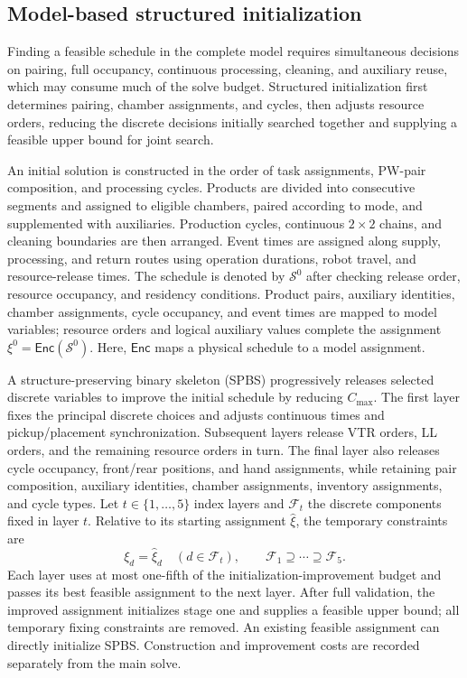 \documentclass[final,5p,times,twocolumn]{elsarticle}
\begin{document}
\subsection{Model-based structured initialization}
\label{sec:pjob-encoding-cn}
Finding a feasible schedule in the complete model requires simultaneous decisions on pairing, full occupancy, continuous processing, cleaning, and auxiliary reuse, which may consume much of the solve budget. Structured initialization first determines pairing, chamber assignments, and cycles, then adjusts resource orders, reducing the discrete decisions initially searched together and supplying a feasible upper bound for joint search.

An initial solution is constructed in the order of task assignments, PW-pair composition, and processing cycles. Products are divided into consecutive segments and assigned to eligible chambers, paired according to mode, and supplemented with auxiliaries. Production cycles, continuous $2\times2$ chains, and cleaning boundaries are then arranged. Event times are assigned along supply, processing, and return routes using operation durations, robot travel, and resource-release times. The schedule is denoted by $\mathcal S^0$ after checking release order, resource occupancy, and residency conditions. Product pairs, auxiliary identities, chamber assignments, cycle occupancy, and event times are mapped to model variables; resource orders and logical auxiliary values complete the assignment $\xi^0=\mathsf{Enc}(\mathcal S^0)$. Here, $\mathsf{Enc}$ maps a physical schedule to a model assignment.

A structure-preserving binary skeleton (SPBS) progressively releases selected discrete variables to improve the initial schedule by reducing $C_{\max}$. The first layer fixes the principal discrete choices and adjusts continuous times and pickup/placement synchronization. Subsequent layers release VTR orders, LL orders, and the remaining resource orders in turn. The final layer also releases cycle occupancy, front/rear positions, and hand assignments, while retaining pair composition, auxiliary identities, chamber assignments, inventory assignments, and cycle types. Let $t\in\{1,\ldots,5\}$ index layers and $\mathcal F_t$ the discrete components fixed in layer $t$. Relative to its starting assignment $\widehat\xi$, the temporary constraints are
\begin{equation}
\xi_d=\widehat\xi_d\quad(d\in\mathcal F_t),\qquad
\mathcal F_1\supseteq\cdots\supseteq\mathcal F_5.
\label{eq:spbs-fix-cn}
\end{equation}
Each layer uses at most one-fifth of the initialization-improvement budget and passes its best feasible assignment to the next layer. After full validation, the improved assignment initializes stage one and supplies a feasible upper bound; all temporary fixing constraints are removed. An existing feasible assignment can directly initialize SPBS. Construction and improvement costs are recorded separately from the main solve.
\end{document}
